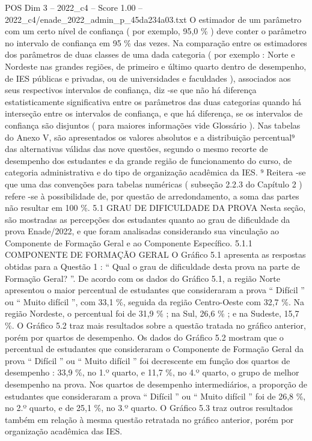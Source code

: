 \begin{textsample}{POS Dim 3 – 2022\_c4 – Score 1.00 – 2022\_c4/enade\_2022\_admin\_p\_45da234a03.txt}
O estimador de um parâmetro com um certo nível de confiança ( por exemplo, 95,0 \% ) deve conter o parâmetro no intervalo de confiança em 95 \% das vezes.
Na comparação entre os estimadores dos parâmetros de duas classes de uma dada categoria ( por exemplo : Norte e Nordeste nas grandes regiões, de primeiro e último quarto dentro de desempenho, de IES públicas e privadas, ou de universidades e faculdades ), associados aos seus respectivos intervalos de confiança, diz -se que não há diferença estatisticamente significativa entre os parâmetros das duas categorias quando há interseção entre os intervalos de confiança, e que há diferença, se os intervalos de confiança são disjuntos ( para maiores informações vide Glossário ).
Nas tabelas do Anexo V, são apresentados os valores absolutos e a distribuição percentual⁹ das alternativas válidas das nove questões, segundo o mesmo recorte de desempenho dos estudantes e da grande região de funcionamento do curso, de categoria administrativa e do tipo de organização acadêmica da IES. ⁹ Reitera -se que uma das convenções para tabelas numéricas ( subseção 2.2.3 do Capítulo 2 ) refere -se à possibilidade de, por questão de arredondamento, a soma das partes não resultar em 100 \%. 5.1 GRAU DE DIFICULDADE DA PROVA Nesta seção, são mostradas as percepções dos estudantes quanto ao grau de dificuldade da prova Enade/2022, e que foram analisadas considerando sua vinculação ao Componente de Formação Geral e ao Componente Específico. 5.1.1 COMPONENTE DE FORMAÇÃO GERAL O Gráfico 5.1 apresenta as respostas obtidas para a Questão 1 : “ Qual o grau de dificuldade desta prova na parte de Formação Geral? ”.
De acordo com os dados do Gráfico 5.1, a região Norte apresentou o maior percentual de estudantes que consideraram a prova “ Difícil ” ou “ Muito difícil ”, com 33,1 \%, seguida da região Centro-Oeste com 32,7 \%.
Na região Nordeste, o percentual foi de 31,9 \% ; na Sul, 26,6 \% ; e na Sudeste, 15,7 \%.
O Gráfico 5.2 traz mais resultados sobre a questão tratada no gráfico anterior, porém por quartos de desempenho.
Os dados do Gráfico 5.2 mostram que o percentual de estudantes que consideraram o Componente de Formação Geral da prova “ Difícil ” ou “ Muito difícil ” foi decrescente em função dos quartos de desempenho : 33,9 \%, no 1.º quarto, e 11,7 \%, no 4.º quarto, o grupo de melhor desempenho na prova.
Nos quartos de desempenho intermediários, a proporção de estudantes que consideraram a prova “ Difícil ” ou “ Muito difícil ” foi de 26,8 \%, no 2.º quarto, e de 25,1 \%, no 3.º quarto.
O Gráfico 5.3 traz outros resultados também em relação à mesma questão retratada no gráfico anterior, porém por organização acadêmica das IES.

\end{textsample}
